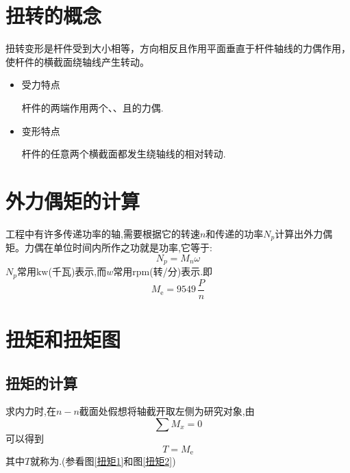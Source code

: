 \section{扭转的概念}
\vspace*{-1.5em}
\begin{definition}[扭转变形]
	扭转变形是杆件受到大小相等，方向相反且作用平面垂直于杆件轴线的力偶作用，使杆件的横截面绕轴线产生转动。
	\begin{itemize}
		\item 受力特点
		\par 杆件的两端作用两个、、且的力偶.
		\item 变形特点
		\par 杆件的任意两个横截面都发生绕轴线的相对转动.
	\end{itemize}
	\end{definition}

\section{外力偶矩的计算}
\vspace*{-1.5em}
\begin{theorem}[外力偶矩]
	工程中有许多传递功率的轴,需要根据它的转速$n$和传递的功率$N_p$计算出外力偶矩。力偶在单位时间内所作之功就是功率,它等于:
\begin{equation}
	N_p = M_n \omega
\end{equation}
$N_p$常用$\text{kw}$(千瓦)表示,而$w$常用$\text{rpm}$(转/分)表示.即
\begin{equation}
	M_\text{e}=9549\,\frac{P}{n}
\end{equation}
\end{theorem}

\section{扭矩和扭矩图}
\subsection{扭矩的计算}

 求内力时,在$n-n$截面处假想将轴截开取左侧为研究对象,由
$$
\sum M_x = 0
$$
可以得到
\begin{equation}
	T=M_\text{e}
\end{equation}
其中$T$就称为.(参看图\ref{扭矩1}和图\ref{扭矩2})

